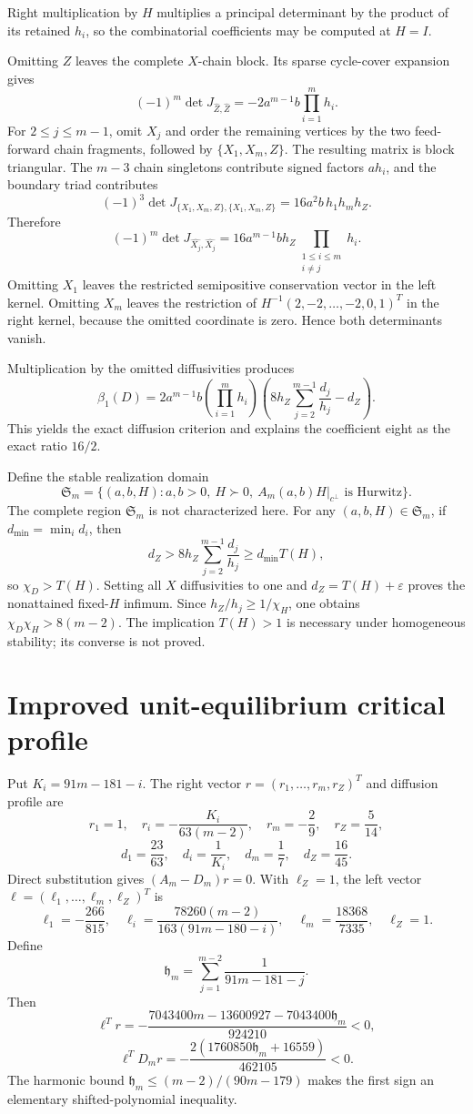 \documentclass[10pt]{article}
\newcommand{\1}{\mathbf1}
\begin{document}
Right multiplication by $H$ multiplies a principal determinant by the product
of its retained $h_i$, so the combinatorial coefficients may be computed at
$H=I$.

Omitting $Z$ leaves the complete $X$-chain block.  Its sparse cycle-cover
expansion gives
\[
 (-1)^m\det J_{\widehat Z,\widehat Z}
 =-2a^{m-1}b\prod_{i=1}^mh_i.
\]
For $2\le j\le m-1$, omit $X_j$ and order the remaining vertices by the two
feed-forward chain fragments, followed by $\{X_1,X_m,Z\}$.  The resulting
matrix is block triangular.  The $m-3$ chain singletons contribute signed
factors $a h_i$, and the boundary triad contributes
\[
 (-1)^3\det J_{\{X_1,X_m,Z\},\{X_1,X_m,Z\}}
 =16a^2b\,h_1h_mh_Z.
\]
Therefore
\[
 (-1)^m\det J_{\widehat{X_j},\widehat{X_j}}
 =16a^{m-1}bh_Z\prod_{\substack{1\le i\le m\\i\ne j}}h_i.
\]
Omitting $X_1$ leaves the restricted semipositive conservation vector in the
left kernel.  Omitting $X_m$ leaves the restriction of
$H^{-1}(2,-2,\ldots,-2,0,1)^T$ in the right kernel, because the omitted
coordinate is zero.  Hence both determinants vanish.

Multiplication by the omitted diffusivities produces
\[
 \beta_1(D)=2a^{m-1}b\left(\prod_{i=1}^mh_i\right)
 \left(8h_Z\sum_{j=2}^{m-1}\frac{d_j}{h_j}-d_Z\right).
\]
This yields the exact diffusion criterion and explains the coefficient eight
as the exact ratio $16/2$.

Define the stable realization domain
\[
 \mathfrak S_m=\{(a,b,H):a,b>0,\ H\succ0,\
 A_m(a,b)H|_{c^\perp}\text{ is Hurwitz}\}.
\]
The complete region $\mathfrak S_m$ is not characterized here.  For any
$(a,b,H)\in\mathfrak S_m$, if $d_{\min}=\min_i d_i$, then
\[
 d_Z>8h_Z\sum_{j=2}^{m-1}\frac{d_j}{h_j}
 \ge d_{\min}T(H),
\]
so $\chi_D>T(H)$.  Setting all $X$ diffusivities to one and
$d_Z=T(H)+\varepsilon$ proves the nonattained fixed-$H$ infimum.  Since
$h_Z/h_j\ge1/\chi_H$, one obtains $\chi_D\chi_H>8(m-2)$.  The implication
$T(H)>1$ is necessary under homogeneous stability; its converse is not proved.

\section{Improved unit-equilibrium critical profile}

Put $K_i=91m-181-i$.  The right vector
$r=(r_1,\ldots,r_m,r_Z)^T$ and diffusion profile are
\[
 r_1=1,\quad r_i=-\frac{K_i}{63(m-2)},\quad
 r_m=-\frac29,\quad r_Z=\frac5{14},
\]
\[
 d_1=\frac{23}{63},\quad d_i=\frac1{K_i},\quad
 d_m=\frac17,\quad d_Z=\frac{16}{45}.
\]
Direct substitution gives $(A_m-D_m)r=0$.  With $\ell_Z=1$, the left vector
$\ell=(\ell_1,\ldots,\ell_m,\ell_Z)^T$ is
\[
 \ell_1=-\frac{266}{815},\quad
 \ell_i=\frac{78260(m-2)}{163(91m-180-i)},\quad
 \ell_m=\frac{18368}{7335},\quad \ell_Z=1.
\]
Define
\[
 \mathfrak h_m=\sum_{j=1}^{m-2}\frac1{91m-181-j}.
\]
Then
\[
 \ell^Tr=-\frac{7043400m-13600927-7043400\mathfrak h_m}{924210}<0,
\]
\[
 \ell^TD_mr=-\frac{2(1760850\mathfrak h_m+16559)}{462105}<0.
\]
The harmonic bound $\mathfrak h_m\le(m-2)/(90m-179)$ makes the first sign an elementary
shifted-polynomial inequality.
\end{document}
